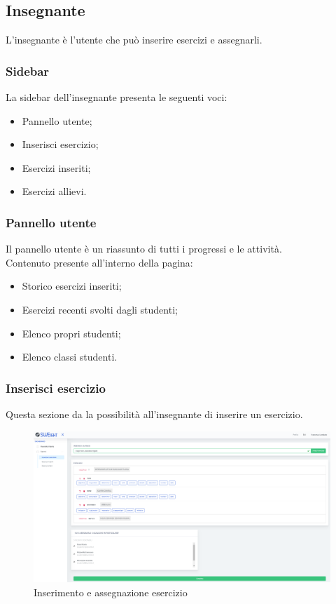 \newpage
    \subsection{Insegnante}
      L'insegnante è l'utente che può inserire esercizi e assegnarli.
        \subsubsection{Sidebar}
          La sidebar dell'insegnante presenta le seguenti voci:
        	\begin{itemize}
            	\item Pannello utente;
            	\item Inserisci esercizio;
            	\item Esercizi inseriti;
            	\item Esercizi allievi.
        	\end{itemize}
        
        
        
        \subsubsection{Pannello utente}
          Il pannello utente è un riassunto di tutti i progressi e le attività.
         \\Contenuto presente all'interno della pagina:
        	\begin{itemize}
        		\item Storico esercizi inseriti; 
        		\item Esercizi recenti svolti dagli studenti;
        		\item Elenco propri studenti;
        		\item Elenco classi studenti.
        	\end{itemize}
        
        
        
        
        \subsubsection{Inserisci esercizio}
          Questa sezione da la possibilità all'insegnante di inserire un esercizio.
        	\begin{figure}[H]
            	\centering
        		\includegraphics[width=17cm]{sez/img/insegnante/inserisciEsercizio.PNG} 
            	\caption{Inserimento e assegnazione esercizio}\label{fig:1}
        	\end{figure}
        
